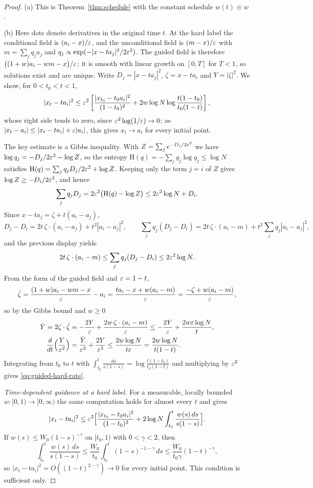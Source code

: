 \documentclass{article} %
\makeatletter
\newif\ificlr
\newcommand{\placeblock}[1]{\ificlr\@nameuse{moved@#1}\fi}
\theoremstyle{plain}
\theoremstyle{definition}
\theoremstyle{remark}
\makeatother
\begin{document}
\label{apx:pf-cfgatom}
\propcfgatom*
\placeblock{sketchcfg}
\begin{proof}
(a) This is Theorem~\ref{thm:schedule} with the constant schedule $w(t)\equiv w$.

(b) Here dots denote derivatives in the original time $t$. At the hard label the conditional
field is $(a_i-x)/\varepsilon$, and the unconditional field is $(m-x)/\varepsilon$ with $m=\sum_jq_ja_j$ and
$q_j\propto\exp(-|x-ta_j|^2/2\varepsilon^2)$. The guided field is therefore
$\bigl((1+w)a_i-wm-x\bigr)/\varepsilon$; it is smooth with linear growth on $[0,T]$ for $T<1$, so solutions
exist and are unique. Write $D_j=|x-ta_j|^2$, $\zeta=x-ta_i$ and $Y=|\zeta|^2$. We show, for
$0<t_0<t<1$,
\begin{equation}
|x_t-ta_i|^2\le\varepsilon^2\left[\frac{|x_{t_0}-t_0a_i|^2}{(1-t_0)^2}
+2w\log N\log\frac{t(1-t_0)}{t_0(1-t)}\right],
\label{eq:guided-hard-rate}
\end{equation}
whose right side tends to zero, since $\varepsilon^2\log(1/\varepsilon)\to0$; as
$|x_t-a_i|\le|x_t-ta_i|+\varepsilon|a_i|$, this gives $x_t\to a_i$ for every initial point.

The key estimate is a Gibbs inequality. With $Z=\sum_je^{-D_j/2\varepsilon^2}$ we have
$\log q_j=-D_j/2\varepsilon^2-\log Z$, so the entropy $\mathrm H(q)=-\sum_jq_j\log q_j\le\log N$ satisfies
$\mathrm H(q)=\sum_jq_jD_j/2\varepsilon^2+\log Z$. Keeping only the term $j=i$ of $Z$ gives
$\log Z\ge-D_i/2\varepsilon^2$, and hence
\[
\sum_jq_jD_j=2\varepsilon^2\bigl(\mathrm H(q)-\log Z\bigr)\le2\varepsilon^2\log N+D_i .
\]
Since $x-ta_j=\zeta+t(a_i-a_j)$,
\[
D_j-D_i=2t\,\zeta\cdot(a_i-a_j)+t^2|a_i-a_j|^2,\qquad
\sum_jq_j(D_j-D_i)=2t\,\zeta\cdot(a_i-m)+t^2\sum_jq_j|a_i-a_j|^2,
\]
and the previous display yields
\[
2t\,\zeta\cdot(a_i-m)\le\sum_jq_j(D_j-D_i)\le2\varepsilon^2\log N .
\]
From the form of the guided field and $\varepsilon=1-t$,
\[
\dot\zeta=\frac{(1+w)a_i-wm-x}{\varepsilon}-a_i=\frac{ta_i-x+w(a_i-m)}{\varepsilon}=\frac{-\zeta+w(a_i-m)}{\varepsilon},
\]
so by the Gibbs bound and $w\ge0$
\begin{align*}
\dot Y=2\zeta\cdot\dot\zeta&=-\frac{2Y}{\varepsilon}+\frac{2w\,\zeta\cdot(a_i-m)}{\varepsilon}
\le-\frac{2Y}{\varepsilon}+\frac{2w\varepsilon\log N}{t},\\
\frac{d}{dt}\Bigl(\frac{Y}{\varepsilon^2}\Bigr)&=\frac{\dot Y}{\varepsilon^2}+\frac{2Y}{\varepsilon^3}
\le\frac{2w\log N}{t\varepsilon}=\frac{2w\log N}{t(1-t)} .
\end{align*}
Integrating from $t_0$ to $t$ with $\int_{t_0}^t\frac{ds}{s(1-s)}=\log\frac{t(1-t_0)}{t_0(1-t)}$ and
multiplying by $\varepsilon^2$ gives \eqref{eq:guided-hard-rate}.

\emph{Time-dependent guidance at a hard label.} For a measurable, locally bounded
$w:[0,1)\to[0,\infty)$ the same computation holds for almost every $t$ and gives
\[
|x_t-ta_i|^2\le\varepsilon^2\Bigl[\frac{|x_{t_0}-t_0a_i|^2}{(1-t_0)^2}
+2\log N\int_{t_0}^t\frac{w(s)\,ds}{s(1-s)}\Bigr].
\]
If $w(s)\le W_0(1-s)^{-\gamma}$ on $[t_0,1)$ with $0<\gamma<2$, then
\[
\int_{t_0}^t\frac{w(s)\,ds}{s(1-s)}\le\frac{W_0}{t_0}\int_{t_0}^t(1-s)^{-1-\gamma}\,ds
\le\frac{W_0}{t_0\gamma}(1-t)^{-\gamma},
\]
so $|x_t-ta_i|^2=O((1-t)^{2-\gamma})\to0$ for every initial point. This condition is sufficient
only.
\end{proof}
\end{document}
